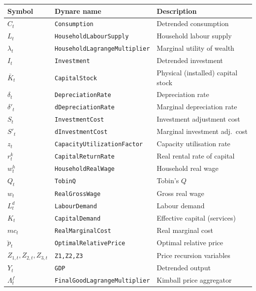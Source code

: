\documentclass[11pt,a4paper]{article}
\newcommand{\bbar}[1]{\bar{#1}}
\begin{document}
\begin{center}
\begin{tabular}{lll}
\toprule
\textbf{Symbol} & \textbf{Dynare name} & \textbf{Description} \\
\midrule
$C_t$         & \texttt{Consumption}          & Detrended consumption \\
$L_t$         & \texttt{HouseholdLabourSupply} & Household labour supply \\
$\lambda_t$   & \texttt{HouseholdLagrangeMultiplier} & Marginal utility of wealth \\
$I_t$         & \texttt{Investment}            & Detrended investment \\
$\bbar K_t$   & \texttt{CapitalStock}          & Physical (installed) capital stock \\
$\delta_t$    & \texttt{DepreciationRate}       & Depreciation rate \\
$\delta'_t$   & \texttt{dDepreciationRate}      & Marginal depreciation rate \\
$S_t$         & \texttt{InvestmentCost}         & Investment adjustment cost \\
$S'_t$        & \texttt{dInvestmentCost}        & Marginal investment adj.\ cost \\
$z_t$         & \texttt{CapacityUtilizationFactor} & Capacity utilisation rate \\
$r^k_t$       & \texttt{CapitalReturnRate}      & Real rental rate of capital \\
$w^h_t$       & \texttt{HouseholdRealWage}      & Household real wage \\
$Q_t$         & \texttt{TobinQ}                 & Tobin's $Q$ \\
\midrule
$w_t$         & \texttt{RealGrossWage}          & Gross real wage \\
$L^d_t$       & \texttt{LabourDemand}           & Labour demand \\
$K_t$         & \texttt{CapitalDemand}          & Effective capital (services) \\
$mc_t$        & \texttt{RealMarginalCost}       & Real marginal cost \\
$\breve p_t$       & \texttt{OptimalRelativePrice}   & Optimal relative price \\
$Z_{1,t},Z_{2,t},Z_{3,t}$ & \texttt{Z1,Z2,Z3}  & Price recursion variables \\
$Y_t$         & \texttt{GDP}                    & Detrended output \\
$\Lambda^f_t$ & \texttt{FinalGoodLagrangeMultiplier} & Kimball price aggregator \\

\end{tabular}
\end{center}
\end{document}
